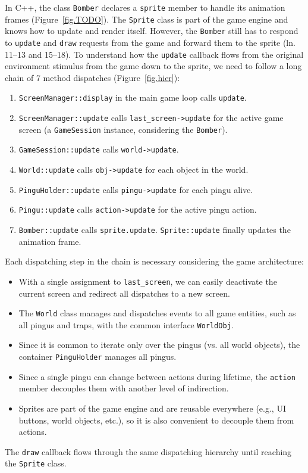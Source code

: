 \documentclass{vgtc}                          %
\newcommand{\code}[1] {{\small{\texttt{#1}}}}
\begin{document}
In C++, the class \code{Bomber} declares a \code{sprite} member to handle its
animation frames (Figure~\ref{fig.TODO}).
%
The \code{Sprite} class is part of the game engine and knows how to update and
render itself.
However, the \code{Bomber} still has to respond to \code{update} and
\code{draw} requests from the game and forward them to the sprite
(ln. 11--13 and 15--18).
%
To understand how the \code{update} callback flows from the original
environment stimulus from the game down to the sprite, we need to follow a long
chain of 7 method dispatches (Figure~\ref{fig.hier}):
%
\begin{enumerate}
\item \code{ScreenManager::display} in the main game loop calls \code{update}.
\item \code{ScreenManager::update} calls \code{last\_screen->update} for the
      active game screen (a \code{GameSession} instance, considering the
      \code{Bomber}).
\item \code{GameSession::update} calls \code{world->update}.
\item \code{World::update} calls \code{obj->update} for each object in the
      world.
\item \code{PinguHolder::update} calls \code{pingu->update} for each pingu
      alive.
\item \code{Pingu::update} calls \code{action->update} for the active pingu
      action.
\item \code{Bomber::update} calls \code{sprite.update}.
      \code{Sprite::update} finally updates the animation frame.
\end{enumerate}
%
Each dispatching step in the chain is necessary considering the game
architecture:
%
\begin{itemize}
\item With a single assignment to \code{last\_screen}, we can easily deactivate
      the current screen and redirect all dispatches to a new screen.
\item The \code{World} class manages and dispatches events to all game
      entities, such as all pingus and traps, with the common interface
      \code{WorldObj}.
\item Since it is common to iterate only over the pingus (vs. all world
      objects), the container \code{PinguHolder} manages all pingus.
\item Since a single pingu can change between actions during lifetime, the
      \code{action} member decouples them with another level of indirection.
\item Sprites are part of the game engine and are reusable everywhere (e.g., UI
      buttons, world objects, etc.), so it is also convenient to decouple them
      from actions.
\end{itemize}
%
The \code{draw} callback flows through the same dispatching hierarchy until
reaching the \code{Sprite} class.
\end{document}
